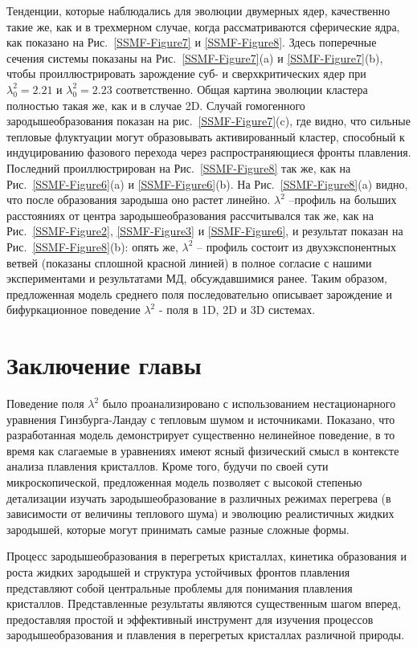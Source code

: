 Тенденции, которые наблюдались для эволюции двумерных ядер, качественно такие же, как и в трехмерном случае, когда рассматриваются сферические ядра, как показано на Рис.~\ref{SSMF-Figure7} и \ref{SSMF-Figure8}. Здесь поперечные сечения системы показаны на Рис.~\ref{SSMF-Figure7}(a) и \ref{SSMF-Figure7}(b), чтобы проиллюстрировать зарождение суб- и сверхкритических ядер при $\lambda_0^2 = 2.21$ и $\lambda_0^2 = 2.23$ соответственно.
Общая картина эволюции кластера полностью такая же, как и в случае 2D. Случай гомогенного зародышеобразования показан на рис.~\ref{SSMF-Figure7}(c), где видно, что сильные тепловые флуктуации могут образовывать активированный кластер, способный к индуцированию фазового перехода через распространяющиеся фронты плавления. Последний проиллюстрирован на Рис.~\ref{SSMF-Figure8} так же, как на Рис.~\ref{SSMF-Figure6}(a) и \ref{SSMF-Figure6}(b).
На Рис.~\ref{SSMF-Figure8}(a) видно, что после образования зародыша оно растет линейно. $\lambda ^ 2$ --профиль на больших расстояниях от центра зародышеобразования рассчитывался так же, как на Рис.~\ref{SSMF-Figure2}, \ref{SSMF-Figure3} и \ref{SSMF-Figure6}, и результат показан на Рис.~\ref{SSMF-Figure8}(b): опять же, $\lambda ^ 2$ -- профиль состоит из двухэкспонентных ветвей (показаны сплошной красной линией) в полное согласие с нашими экспериментами и результатами МД, обсуждавшимися ранее. Таким образом, предложенная модель среднего поля последовательно описывает зарождение и бифуркационное поведение $\lambda ^ 2$ - поля в 1D, 2D и 3D системах.

\section{Заключение главы}

Поведение поля $\lambda^2$ было проанализировано с использованием нестационарного уравнения Гинзбурга-Ландау с тепловым шумом и источниками.
Показано, что разработанная модель демонстрирует существенно нелинейное поведение, в то время как слагаемые в уравнениях имеют ясный физический смысл в контексте анализа плавления кристаллов.
Кроме того, будучи по своей сути микроскопической, предложенная модель позволяет с высокой степенью детализации изучать зародышеобразование в различных режимах перегрева (в зависимости от величины теплового шума) и эволюцию реалистичных жидких зародышей, которые могут принимать самые разные сложные формы.


Процесс зародышеобразования в перегретых кристаллах, кинетика образования и роста жидких зародышей и структура устойчивых фронтов плавления представляют собой центральные проблемы для понимания плавления кристаллов.
Представленные результаты являются существенным шагом вперед, предоставляя простой и эффективный инструмент для изучения процессов зародышеобразования и плавления в перегретых кристаллах различной природы.

